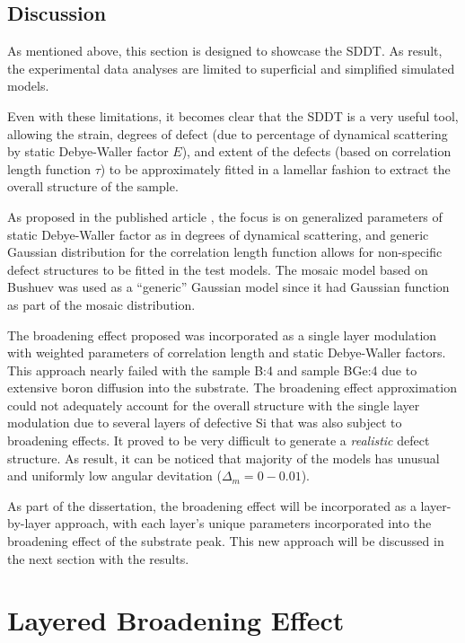 \subsection{Discussion}
As mentioned above, this section is designed to showcase the SDDT.  As result, the experimental data analyses are limited to superficial and simplified simulated models.

Even with these limitations, it becomes clear that the SDDT is a very useful tool, allowing the strain, degrees of defect (due to percentage of dynamical scattering by static Debye-Waller factor $E$), and extent of the defects (based on correlation length function $\tau$) to be approximately fitted in a lamellar fashion to extract the overall structure of the sample.

As proposed in the published article \cite{Shreeman1}, the focus is on generalized parameters of static Debye-Waller factor as in degrees of dynamical scattering, and generic Gaussian distribution for the correlation length function allows for non-specific defect structures to be fitted in the test models.  The mosaic model based on Bushuev \cite{Bushuev2} was used as a ``generic'' Gaussian model since it had Gaussian function as part of the mosaic distribution.

The broadening effect proposed was incorporated as a single layer modulation with weighted parameters of correlation length and static Debye-Waller factors.  This approach nearly failed with the sample B:4 and sample BGe:4 due to extensive boron diffusion into the substrate.  The broadening effect approximation could not adequately account for the overall structure with the single layer modulation due to several layers of defective Si that was also subject to broadening effects.  It proved to be very difficult to generate a {\itshape{realistic}} defect structure.  As result, it can be noticed that majority of the models has unusual and uniformly low angular devitation  ($\Delta_m =0- 0.01$).

As part of the dissertation, the broadening effect will be incorporated as a layer-by-layer approach, with each layer's unique parameters incorporated into the broadening effect of the substrate peak.  This new approach will be discussed in the next section with the results.

\section{Layered Broadening Effect}

